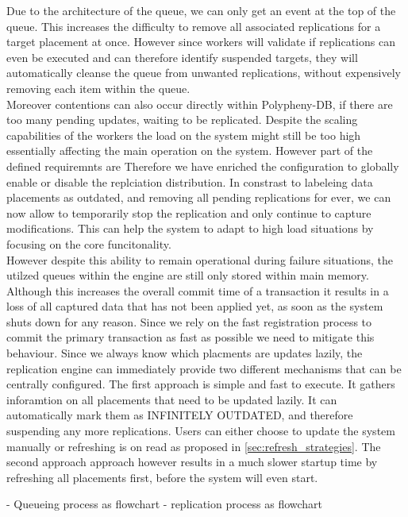 Due to the architecture of the queue, we can only get an event at the top of the queue. This increases the difficulty to remove all associated replications 
for a target placement at once. However since workers will validate if replications can even be executed and can therefore identify suspended targets, they will
automatically cleanse the queue from unwanted replications, without expensively removing each item within the queue.\\

Moreover contentions can also occur directly within Polypheny-DB, if there are too many pending updates, waiting to be replicated.
Despite the scaling capabilities of the workers the load on the system might still be too high essentially affecting the main operation on the system.
However part of the defined requiremnts are 
Therefore we have enriched the configuration to globally enable or disable the replciation distribution. In constrast to labeleing data placements as outdated, 
and removing all pending replications for ever, we can now allow to temporarily stop the replication and only continue to capture modifications. This can help the system
to adapt to high load situations by focusing on the core funcitonality.\\

However despite this ability to remain operational during failure situations, the utilzed queues within the engine are still only stored within main memory.
Although this increases the overall commit time of a transaction it results in a loss of all captured data that has not been applied yet, as soon as the system 
shuts down for any reason. Since we rely on the fast registration process to commit the primary transaction as fast as possible we need to mitigate this behaviour.
Since we always know which placments are updates lazily, the replication engine can immediately provide two different mechanisms that can be centrally configured. 
The first approach is simple and fast to execute. It gathers inforamtion on all placements that need to be updated lazily. It can automatically mark them as INFINITELY OUTDATED, 
and therefore suspending any more replications. Users can either choose to update the system manually or refreshing is on read as proposed in \ref{sec:refresh_strategies}.
The second approach approach however results in a much slower startup time by refreshing all placements first, before the system will even start.


- Queueing process as flowchart
- replication process as flowchart



